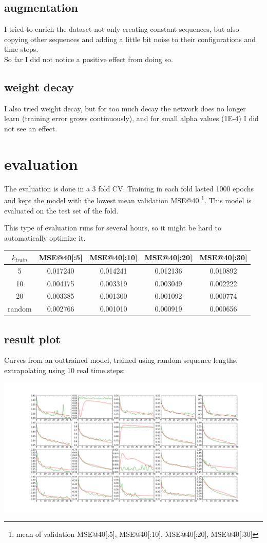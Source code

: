 \documentclass[a4paper,10pt]{article}
\begin{document}
\subsection{augmentation}

I tried to enrich the dataset not only creating constant sequences, but also copying other sequences
and adding a little bit noise to their configurations and time steps.\\
So far I did not notice a positive effect from doing so.

\subsection{weight decay}

I also tried weight decay, but for too much decay the network does no longer learn (training error grows continuously),
and for small alpha values (1E-4) I did not see an effect.

\section{evaluation}

The evaluation is done in a 3 fold CV. Training in each fold lasted 1000 epochs and kept the model with the lowest mean validation MSE@40
\footnote{mean of validation MSE@40[:5], MSE@40[:10], MSE@40[:20], MSE@40[:30]}.
This model is evaluated on the test set of the fold.

This type of evaluation runs for several hours, so it might be hard to automatically optimize it.

\begin{tabular}{|c|c|c|c|c|}
 \hline
 $k_{train}$ & MSE@40[:5] & MSE@40[:10] & MSE@40[:20] & MSE@40[:30] \\
 \hline
 5 & 0.017240 & 0.014241 & 0.012136 & 0.010892 \\
 10 & 0.004175 & 0.003319 & 0.003049 & 0.002222 \\
 20 & 0.003385 & 0.001300 & 0.001092 & 0.000774 \\
 random & 0.002766 & 0.001010 & 0.000919 & 0.000656 \\
 \hline
\end{tabular}


\subsection{result plot}

Curves from an outtrained model, trained using random sequence lengths, extrapolating using 10 real time steps:

\includegraphics[width=1.2\textwidth]{../../figures/model01_rnd_f1_e869}
\end{document}
